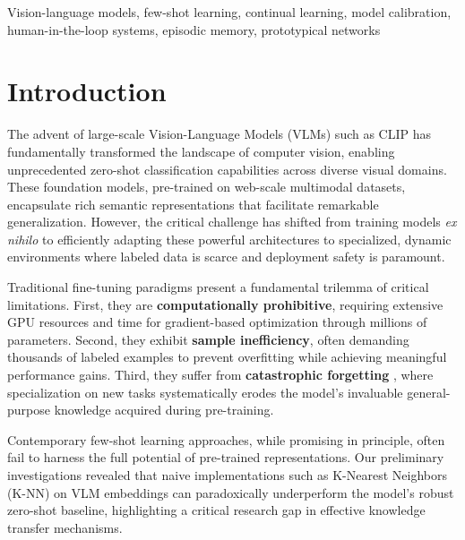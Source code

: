 \documentclass[conference]{IEEEtran}
\begin{document}
\begin{IEEEkeywords}
Vision-language models, few-shot learning, continual learning, model calibration, human-in-the-loop systems, episodic memory, prototypical networks
\end{IEEEkeywords}

\section{Introduction}

The advent of large-scale Vision-Language Models (VLMs) such as CLIP \cite{radford2021learning} has fundamentally transformed the landscape of computer vision, enabling unprecedented zero-shot classification capabilities across diverse visual domains. These foundation models, pre-trained on web-scale multimodal datasets, encapsulate rich semantic representations that facilitate remarkable generalization. However, the critical challenge has shifted from training models \textit{ex nihilo} to efficiently adapting these powerful architectures to specialized, dynamic environments where labeled data is scarce and deployment safety is paramount.

Traditional fine-tuning paradigms present a fundamental trilemma of critical limitations. First, they are \textbf{computationally prohibitive}, requiring extensive GPU resources and time for gradient-based optimization through millions of parameters. Second, they exhibit \textbf{sample inefficiency}, often demanding thousands of labeled examples to prevent overfitting while achieving meaningful performance gains. Third, they suffer from \textbf{catastrophic forgetting} \cite{kirkpatrick2017overcoming}, where specialization on new tasks systematically erodes the model's invaluable general-purpose knowledge acquired during pre-training.

Contemporary few-shot learning approaches, while promising in principle, often fail to harness the full potential of pre-trained representations. Our preliminary investigations revealed that naive implementations such as K-Nearest Neighbors (K-NN) on VLM embeddings can paradoxically underperform the model's robust zero-shot baseline, highlighting a critical research gap in effective knowledge transfer mechanisms.
\end{document}
